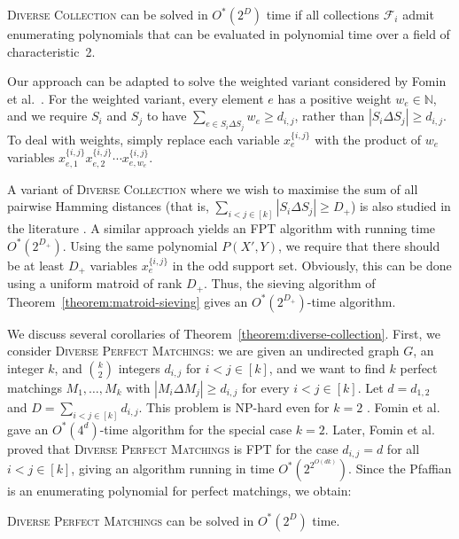 \documentclass{theoretics}
\newcommand{\N}{\ensuremath{\mathbb N}\xspace}
\newcommand{\cF}{\ensuremath{\mathcal F}\xspace}
\begin{document}
\begin{theorem} \label{theorem:diverse-collection}
  \textsc{Diverse Collection} can be solved in $O^*(2^{D})$ time if all collections $\cF_i$ admit enumerating polynomials that can be evaluated in polynomial time over a field of characteristic~2.
\end{theorem}

\begin{remark}
Our approach can be adapted to solve the weighted variant considered by Fomin et al.~\cite{FominGPPS24}.
For the weighted variant, every element $e$ has a positive weight $w_e \in \N$, and we require $S_i$ and $S_j$ to have $\sum_{e \in S_i \Delta S_j} w_e \ge d_{i, j}$, rather than $|S_i \Delta S_j| \ge d_{i, j}$.
To deal with weights, simply replace each variable $x_e^{\{i,j\}}$ with the product of $w_e$ variables $x_{e,1}^{\{i,j\}} x_{e,2}^{\{i,j\}} \cdots x_{e,w_e}^{\{i,j\}}$.
\end{remark}

\begin{remark}
A variant of \textsc{Diverse Collection} where we wish to maximise the sum of all pairwise Hamming distances (that is, $\sum_{i < j \in [k]} |S_i \Delta S_j| \ge D_+$) is also studied in the literature \cite{BasteFJMOPR22,BasteJMPR19,HanakaKKLO22,HanakaKKO21}.
A similar approach yields an FPT algorithm with running time $O^*(2^{D_+})$.
Using the same polynomial $P(X', Y)$, we require that there should be at least $D_+$ variables $x_e^{\{ i, j \}}$ in the odd support set.
Obviously, this can be done using a uniform matroid of rank $D_+$.
Thus, the sieving algorithm of Theorem~\ref{theorem:matroid-sieving} gives an $O^*(2^{D_+})$-time algorithm.
\end{remark}

We discuss several corollaries of Theorem~\ref{theorem:diverse-collection}.
First, we consider \textsc{Diverse Perfect Matchings}:
we are given an undirected graph $G$, an integer $k$, and $\binom{k}{2}$ integers $d_{i,j}$ for $i < j \in [k]$, and we want to find $k$ perfect matchings $M_1, \dots, M_k$ with $|M_i \Delta M_j| \ge d_{i,j}$ for every $i < j \in [k]$.
Let $d = d_{1,2}$ and $D = \sum_{i < j \in [k]} d_{i,j}$.
This problem is NP-hard even for $k = 2$ \cite{Holyer81a}.
Fomin et al.~\cite{FominGJPS24} gave an $O^*(4^{d})$-time algorithm for the special case $k = 2$.
Later, Fomin et al.~\cite{FominGPPS24} proved that \textsc{Diverse Perfect Matchings} is FPT for the case $d_{i,j} = d$ for all $i < j \in [k]$, giving an algorithm running in time $O^*(2^{2^{O(dk)}})$.
Since the Pfaffian is an enumerating polynomial for perfect matchings, we obtain:
\begin{corollary} \label{corollary:diverse-pm}
  \textsc{Diverse Perfect Matchings} can be solved in $O^*(2^{D})$ time.
\end{corollary}
\end{document}
